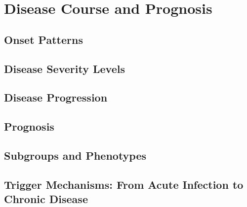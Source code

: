 \chapter{Disease Course and Prognosis}
\label{ch:disease-course}

\section{Onset Patterns}
\label{sec:onset}



\section{Disease Severity Levels}
\label{sec:severity}





\section{Disease Progression}
\label{sec:progression}



\section{Prognosis}
\label{sec:prognosis}



\section{Subgroups and Phenotypes}
\label{sec:subgroups}



\section{Trigger Mechanisms: From Acute Infection to Chronic Disease}
\label{sec:trigger-mechanisms-overview}



